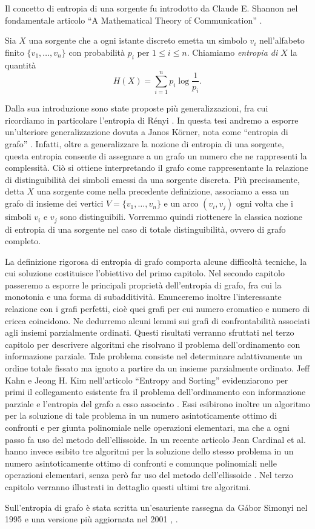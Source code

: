\documentclass[12pt]{article}
\newenvironment{definition}[1][Definizione.]{ 
\begin{trivlist}
	\item[\hskip \labelsep {\bfseries #1}]}{ 
\end{trivlist}
}
\begin{document}
  
Il concetto di entropia di una sorgente fu introdotto da Claude E. Shannon nel fondamentale articolo ``A Mathematical Theory of Communication'' \cite{Shannon1948}.
\begin{definition}
  Sia \(X\) una sorgente che a ogni istante discreto emetta un simbolo \(v_i\) nell'alfabeto finito \(\{v_1,\dots,v_n\}\) con probabilit\`a \(p_i\) per \(1\le i\le n\). Chiamiamo \emph{entropia di \(X\)} la quantit\`a
  \[H(X)=\sum_{i=1}^n{p_i\log{\frac{1}{p_i}}}\text{.}\]
\end{definition}

Dalla sua introduzione sono state proposte più generalizzazioni, fra cui 
ricordiamo in particolare l'entropia di Rényi \cite{renyi1961}. In questa tesi 
andremo a esporre un'ulteriore generalizzazione dovuta a Janos K\"orner, nota 
come ``entropia di grafo'' \cite{Korner1973}. Infatti, oltre a generalizzare 
la nozione di entropia di una sorgente, questa entropia consente di assegnare 
a un grafo un numero che ne rappresenti la complessità. Ciò si ottiene 
interpretando il grafo come rappresentante la relazione di distinguibilità dei 
simboli emessi da una sorgente discreta. Più precisamente, detta \(X\) una 
sorgente come nella precedente definizione, associamo a essa un grafo di 
insieme dei vertici \(V=\{v_1,\dots,v_n\}\) e un arco \((v_i,v_j)\) ogni volta 
che i simboli \(v_i\) e \(v_j\) sono distinguibili. Vorremmo quindi riottenere 
la classica nozione di entropia di una sorgente nel caso di totale 
distinguibilità, ovvero di grafo completo.

La definizione rigorosa di entropia di grafo comporta alcune difficoltà 
tecniche, la cui soluzione costituisce l'obiettivo del primo capitolo. Nel 
secondo capitolo passeremo a esporre le principali proprietà dell'entropia di 
grafo, fra cui la monotonia e una forma di subadditività. Enunceremo inoltre 
l'interessante relazione con i grafi perfetti, cioè quei grafi per cui numero 
cromatico e numero di cricca coincidono. Ne dedurremo alcuni lemmi sui grafi 
di confrontabilità associati agli insiemi parzialmente ordinati. Questi 
risultati verranno sfruttati nel terzo capitolo per descrivere algoritmi che 
risolvano il problema dell'ordinamento con informazione parziale. Tale 
problema consiste nel determinare adattivamente un ordine totale fissato ma 
ignoto a partire da un insieme parzialmente ordinato. Jeff Kahn e Jeong H. Kim 
nell'articolo ``Entropy and Sorting'' evidenziarono per primi il collegamento 
esistente fra il problema dell'ordinamento con informazione parziale e 
l'entropia del grafo a esso associato \cite{Kahn1995}. Essi esibirono inoltre 
un algoritmo per la soluzione di tale problema in un numero asintoticamente 
ottimo di confronti e per giunta polinomiale nelle operazioni elementari, ma 
che a ogni passo fa uso del metodo dell'ellissoide. In un recente articolo 
Jean Cardinal et al. hanno invece esibito tre algoritmi per la soluzione dello 
stesso problema in un numero asintoticamente ottimo di confronti e comunque 
polinomiali nelle operazioni elementari, senza però far uso del metodo 
dell'ellissoide \cite{Cardinal2010}. Nel terzo capitolo verranno illustrati in 
dettaglio questi ultimi tre algoritmi.

Sull'entropia di grafo è stata scritta un'esauriente rassegna da G\'abor 
Simonyi nel 1995 e una versione più aggiornata nel 2001 \cite{Simonyi1995}, 
\cite{Simonyi2001}.
\end{document}
